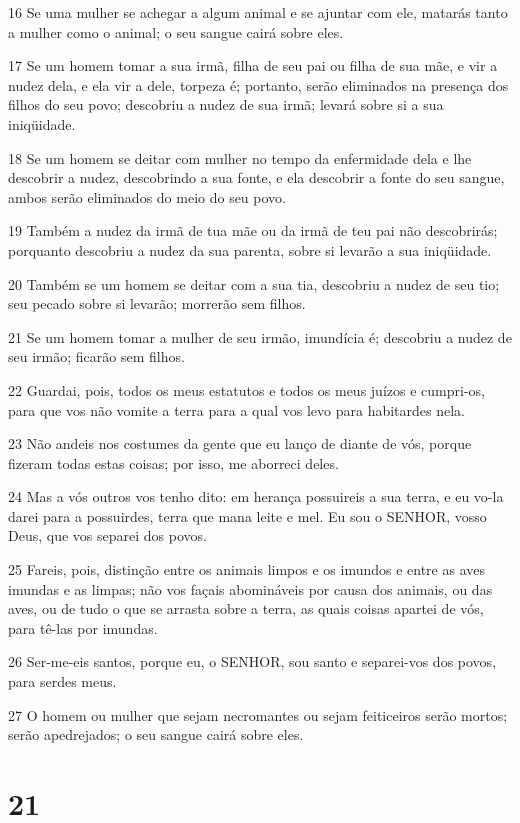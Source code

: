 \par 16 Se uma mulher se achegar a algum animal e se ajuntar com ele, matarás tanto a mulher como o animal; o seu sangue cairá sobre eles.
\par 17 Se um homem tomar a sua irmã, filha de seu pai ou filha de sua mãe, e vir a nudez dela, e ela vir a dele, torpeza é; portanto, serão eliminados na presença dos filhos do seu povo; descobriu a nudez de sua irmã; levará sobre si a sua iniqüidade.
\par 18 Se um homem se deitar com mulher no tempo da enfermidade dela e lhe descobrir a nudez, descobrindo a sua fonte, e ela descobrir a fonte do seu sangue, ambos serão eliminados do meio do seu povo.
\par 19 Também a nudez da irmã de tua mãe ou da irmã de teu pai não descobrirás; porquanto descobriu a nudez da sua parenta, sobre si levarão a sua iniqüidade.
\par 20 Também se um homem se deitar com a sua tia, descobriu a nudez de seu tio; seu pecado sobre si levarão; morrerão sem filhos.
\par 21 Se um homem tomar a mulher de seu irmão, imundícia é; descobriu a nudez de seu irmão; ficarão sem filhos.
\par 22 Guardai, pois, todos os meus estatutos e todos os meus juízos e cumpri-os, para que vos não vomite a terra para a qual vos levo para habitardes nela.
\par 23 Não andeis nos costumes da gente que eu lanço de diante de vós, porque fizeram todas estas coisas; por isso, me aborreci deles.
\par 24 Mas a vós outros vos tenho dito: em herança possuireis a sua terra, e eu vo-la darei para a possuirdes, terra que mana leite e mel. Eu sou o SENHOR, vosso Deus, que vos separei dos povos.
\par 25 Fareis, pois, distinção entre os animais limpos e os imundos e entre as aves imundas e as limpas; não vos façais abomináveis por causa dos animais, ou das aves, ou de tudo o que se arrasta sobre a terra, as quais coisas apartei de vós, para tê-las por imundas.
\par 26 Ser-me-eis santos, porque eu, o SENHOR, sou santo e separei-vos dos povos, para serdes meus.
\par 27 O homem ou mulher que sejam necromantes ou sejam feiticeiros serão mortos; serão apedrejados; o seu sangue cairá sobre eles.

\chapter{21}

